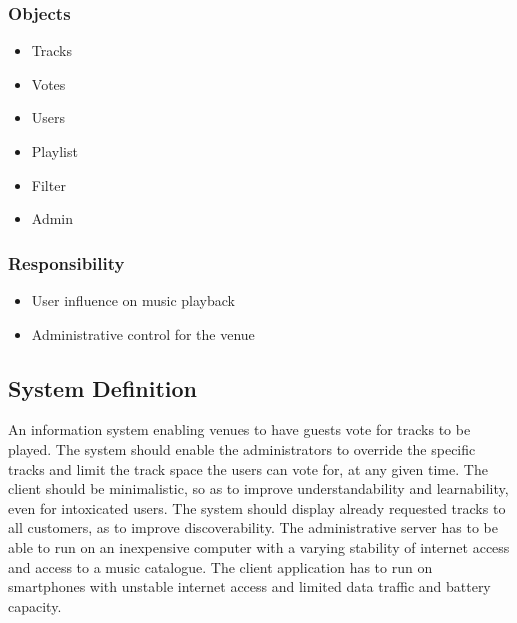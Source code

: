 \subsubsection{Objects}
\begin{itemize}
    \item Tracks
    \item Votes
    \item Users
    \item Playlist
    \item Filter
    \item Admin
\end{itemize}

\subsubsection{Responsibility}
\begin{itemize}
    \item User influence on music playback
    \item Administrative control for the venue
\end{itemize}

\subsection{System Definition}
An information system enabling venues to have guests vote for tracks to be played. The system should enable the administrators to override the specific tracks and limit the track space the users can vote for, at any given time. The client should be minimalistic, so as to improve understandability and learnability, even for intoxicated users. The system should display already requested tracks to all customers, as to improve discoverability.
The administrative server has to be able to run on an inexpensive computer with a varying stability of internet access and access to a music catalogue. The client application has to run on smartphones with unstable internet access and limited data traffic and battery capacity.